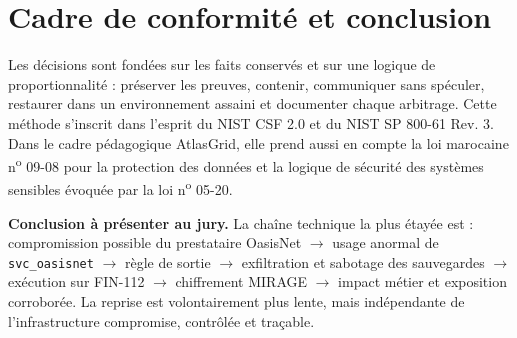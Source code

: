 \documentclass[11pt,a4paper]{article}
\begin{document}
\section{Cadre de conformité et conclusion}

Les décisions sont fondées sur les faits conservés et sur une logique de proportionnalité : préserver les preuves, contenir, communiquer sans spéculer, restaurer dans un environnement assaini et documenter chaque arbitrage. Cette méthode s'inscrit dans l'esprit du NIST CSF 2.0 et du NIST SP 800-61 Rev. 3. Dans le cadre pédagogique AtlasGrid, elle prend aussi en compte la loi marocaine n\textsuperscript{o} 09-08 pour la protection des données et la logique de sécurité des systèmes sensibles évoquée par la loi n\textsuperscript{o} 05-20.

\textbf{Conclusion à présenter au jury.} La chaîne technique la plus étayée est : compromission possible du prestataire OasisNet $\rightarrow$ usage anormal de \texttt{svc\_oasisnet} $\rightarrow$ règle de sortie $\rightarrow$ exfiltration et sabotage des sauvegardes $\rightarrow$ exécution sur FIN-112 $\rightarrow$ chiffrement MIRAGE $\rightarrow$ impact métier et exposition corroborée. La reprise est volontairement plus lente, mais indépendante de l'infrastructure compromise, contrôlée et traçable.
\end{document}
